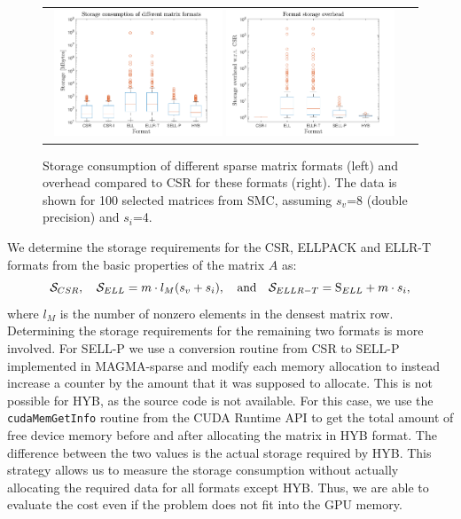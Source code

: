 \begin{figure}[t]
\begin{tabular}{cc}
    \includegraphics[width=0.48\textwidth]{plots/storage_consumption.pdf}
    \includegraphics[width=0.48\textwidth]{plots/storage_overhead.pdf} &
\end{tabular}
\vspace*{-2ex}
    \caption{Storage consumption 
    of different sparse matrix formats (left)
    and overhead compared to CSR for these formats (right).
    The data is shown for 100 selected matrices from SMC,
    assuming $s_v$=8 (double precision) and $s_i$=4.}
\label{fig:storage}
\end{figure}

We determine the storage requirements for the CSR, ELLPACK and ELLR-T formats
from the basic properties of the matrix $A$ as:
\[
    {\cal S}_{CSR}, \quad
    {\cal S}_{ELL}     = m \cdot l_{M}(s_v + s_i), \quad \mbox{\rm and} \quad
    {\cal S}_{ELLR-T}  = \text{S}_{ELL} + m \cdot s_i,
\]
where $l_{M}$ is the number of nonzero elements in the densest matrix row.
Determining the storage requirements for the remaining two formats
is more involved.
For SELL-P we use a conversion routine from CSR to SELL-P implemented in
MAGMA-sparse and modify each memory allocation
to instead increase a counter by the amount that it was supposed to allocate.
This is not possible for HYB, as the source code is not available.
For this case, we use the \texttt{cudaMemGetInfo} routine from the
CUDA Runtime API 
to get the total amount of free device memory
before and after allocating the matrix in HYB format.
The difference between the two values is the actual storage required by HYB.
This strategy allows us to measure the storage consumption
without actually allocating the required data for all formats except HYB.
Thus, we are able to evaluate the cost even if
the problem does not fit into the GPU memory.

